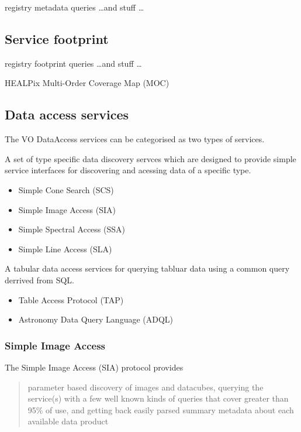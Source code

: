 \documentclass{article}
\begin{document}
registry metadata queries \ldots and stuff \ldots

\subsection{Service footprint}

registry footprint queries \ldots and stuff \ldots

HEALPix Multi-Order Coverage Map (MOC)

\subsection{Data access services}

The VO DataAccess services can be categorised as two types of services.

A set of type specific data discovery servces which are designed to provide
simple service interfaces for discovering and acessing data of a specific type.

\begin{itemize}
  \item Simple Cone Search (SCS)
  \item Simple Image Access (SIA)
  \item Simple Spectral Access (SSA)
  \item Simple Line Access (SLA)
\end{itemize}

A tabular data access services for querying tabluar data using a common query
derrived from SQL.

\begin{itemize}
  \item Table Access Protocol (TAP)
  \item Astronomy Data Query Language (ADQL)
\end{itemize}

\subsubsection{Simple Image Access}

The Simple Image Access (SIA) protocol provides 
\begin{quote}
parameter based discovery of images and datacubes, querying the service(s) with
a few well known kinds of queries that cover greater than 95\% of use, and
getting back easily parsed summary metadata about each available data product
\end{quote}
\end{document}
